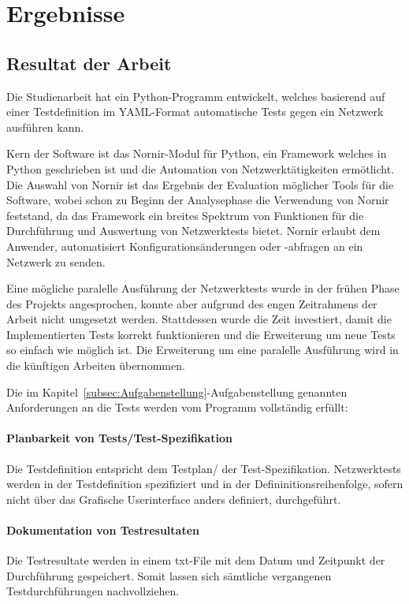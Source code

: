 \documentclass[]{subfiles}
\begin{document}
\section{Ergebnisse}
\subsection{Resultat der Arbeit}
Die Studienarbeit hat ein Python-Programm entwickelt, welches basierend auf einer Testdefinition
im YAML-Format automatische Tests gegen ein Netzwerk ausführen kann.

Kern der Software ist das Nornir-Modul für Python, ein Framework welches in Python geschrieben
ist und die Automation von Netzwerktätigkeiten ermötlicht. 
Die Auswahl von Nornir ist das Ergebnis der Evaluation möglicher Tools für die Software,
wobei schon zu Beginn der Analysephase die Verwendung von Nornir feststand, da das
Framework ein breites Spektrum von Funktionen für die Durchführung und Auswertung von 
Netzwerktests bietet.
Nornir erlaubt dem Anwender, automatisiert Konfigurationsänderungen oder -abfragen an ein 
Netzwerk zu senden.

Eine mögliche paralelle Ausführung der Netzwerktests wurde in der frühen Phase des Projekts
angesprochen, konnte aber aufgrund des engen Zeitrahmens der Arbeit nicht umgesetzt werden.
Stattdessen wurde die Zeit investiert, damit die Implementierten Tests korrekt funktionieren
und die Erweiterung um neue Tests so einfach wie möglich ist.
Die Erweiterung um eine paralelle Ausführung wird in die künftigen Arbeiten übernommen.

Die im Kapitel~\ref{subsec:Aufgabenstellung}-Aufgabenstellung genannten Anforderungen an 
die Tests werden vom Programm vollständig erfüllt:

\paragraph{Planbarkeit von Tests/Test-Spezifikation} 
Die Testdefinition entspricht dem Testplan/ der Test-Spezifikation.
Netzwerktests werden in der Testdefinition spezifiziert und in der Defininitionsreihenfolge,
sofern nicht über das Grafische Userinterface anders definiert, durchgeführt.

\paragraph{Dokumentation von Testresultaten} 
Die Testresultate werden in einem txt-File mit dem Datum und Zeitpunkt der Durchführung 
gespeichert. 
Somit lassen sich sämtliche vergangenen Testdurchführungen nachvollziehen.
\end{document}
